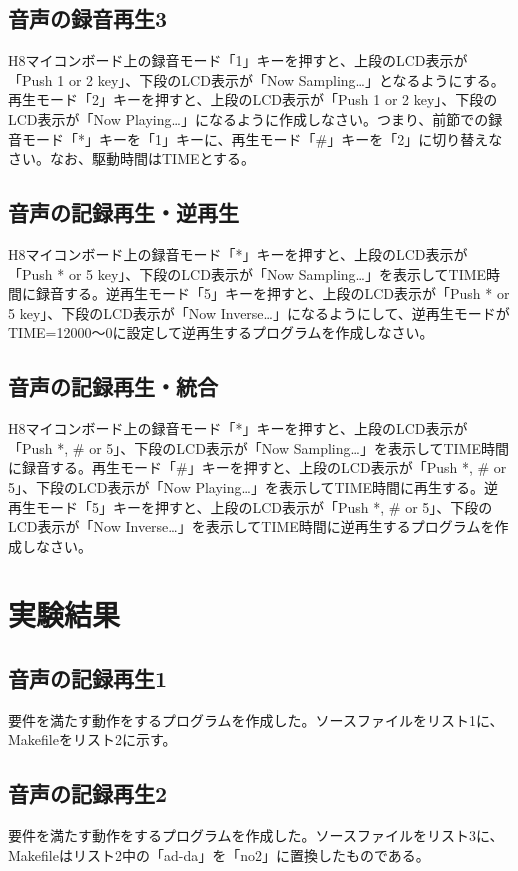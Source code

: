 \documentclass{jarticle}
\begin{document}
\subsection{音声の録音再生3}
H8マイコンボード上の録音モード「1」キーを押すと、上段のLCD表示が「Push 1 or 2 key」、下段のLCD表示が「Now Sampling…」となるようにする。再生モード「2」キーを押すと、上段のLCD表示が「Push 1 or 2 key」、下段のLCD表示が「Now Playing…」になるように作成しなさい。つまり、前節での録音モード「*」キーを「1」キーに、再生モード「#」キーを「2」に切り替えなさい。なお、駆動時間はTIMEとする。

\subsection{音声の記録再生・逆再生}
H8マイコンボード上の録音モード「*」キーを押すと、上段のLCD表示が「Push * or 5 key」、下段のLCD表示が「Now Sampling…」を表示してTIME時間に録音する。逆再生モード「5」キーを押すと、上段のLCD表示が「Push * or 5 key」、下段のLCD表示が「Now Inverse…」になるようにして、逆再生モードがTIME=12000～0に設定して逆再生するプログラムを作成しなさい。

\subsection{音声の記録再生・統合}
H8マイコンボード上の録音モード「*」キーを押すと、上段のLCD表示が「Push *, # or 5」、下段のLCD表示が「Now Sampling…」を表示してTIME時間に録音する。再生モード「#」キーを押すと、上段のLCD表示が「Push *, # or 5」、下段のLCD表示が「Now Playing…」を表示してTIME時間に再生する。逆再生モード「5」キーを押すと、上段のLCD表示が「Push *, # or 5」、下段のLCD表示が「Now Inverse…」を表示してTIME時間に逆再生するプログラムを作成しなさい。

\section{実験結果}

\subsection{音声の記録再生1}
要件を満たす動作をするプログラムを作成した。ソースファイルをリスト1に、Makefileをリスト2に示す。

\subsection{音声の記録再生2}
要件を満たす動作をするプログラムを作成した。ソースファイルをリスト3に、Makefileはリスト2中の「ad-da」を「no2」に置換したものである。
\end{document}

